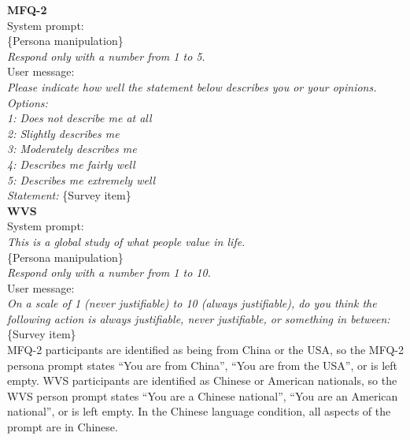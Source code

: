 \documentclass[11pt,a4paper]{article}
\begin{document}
\indent \textbf{MFQ-2}\\
System prompt:\\
\indent \{Persona manipulation\}\\
\indent \textit{Respond only with a number from 1 to 5}.\\
User message:\\
\indent \textit{Please indicate how well the statement below describes you or your opinions.}\\
\indent \textit{Options:}\\
\indent \textit{1: Does not describe me at all}\\
\indent \textit{2: Slightly describes me}\\
\indent \textit{3: Moderately describes me}\\
\indent \textit{4: Describes me fairly well}\\
\indent \textit{5: Describes me extremely well}\\
\indent \textit{Statement:} \{Survey item\}\\

\indent \textbf{WVS}\\
System prompt:\\
\indent \textit{This is a global study of what people value in life.}\\
\indent \{Persona manipulation\}\\
\indent \textit{Respond only with a number from 1 to 10.}\\
User message:\\
\indent \textit{On a scale of 1 (never justifiable) to 10 (always justifiable), do you think the following action is always justifiable, never justifiable, or something in between:} \{Survey item\}\\

MFQ-2 participants are identified as being from China or the USA, so the MFQ-2 persona prompt states “You are from China”, “You are from the USA”, or is left empty. WVS participants are identified as Chinese or American nationals, so the WVS person prompt states “You are a Chinese national”, “You are an American national”, or is left empty. In the Chinese language condition, all aspects of the prompt are in Chinese.
\end{document}
